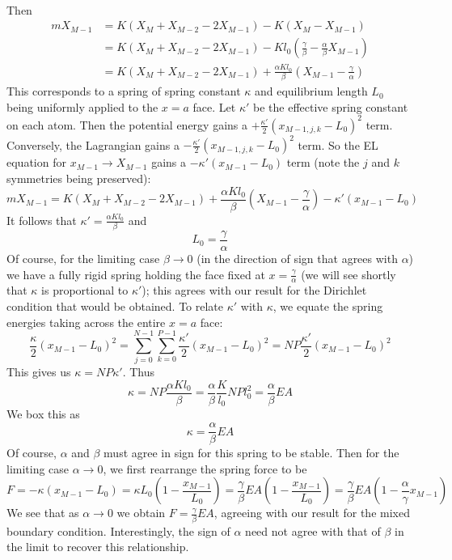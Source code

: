 \documentclass[letterpaper,12pt]{article}
\begin{document}
\begin{flushleft}
\begin{align*}
    \end{align*}
    Then
    \begin{align*}
        mX_{M-1} &= K(X_{M} + X_{M-2} - 2X_{M-1}) - K(X_M - X_{M-1}) \\
        &= K(X_{M} + X_{M-2} - 2X_{M-1}) - Kl_0\left(\frac{\gamma}{\beta} - \frac{\alpha}{\beta}X_{M-1}\right) \\
        &= K(X_{M} + X_{M-2} - 2X_{M-1}) + \frac{\alpha Kl_0}{\beta}\left(X_{M-1} - \frac{\gamma}{\alpha}\right)
    \end{align*}
    This corresponds to a spring of spring constant $\kappa$ and equilibrium length $L_0$ being uniformly applied to the $x=a$ face. Let $\kappa'$ be the effective spring constant on each atom. Then the potential energy gains a $+\frac{\kappa'}{2}\left(x_{M-1,j,k} - L_0\right)^2$ term. Conversely, the Lagrangian gains a $-\frac{\kappa'}{2}\left(x_{M-1,j,k} - L_0\right)^2$ term. So the EL equation for $x_{M-1} \to X_{M-1}$ gains a $-\kappa'\left(x_{M-1} - L_0\right)$ term (note the $j$ and $k$ symmetries being preserved):
    $$mX_{M-1} = K(X_{M} + X_{M-2} - 2X_{M-1}) + \frac{\alpha Kl_0}{\beta}\left(X_{M-1} - \frac{\gamma}{\alpha}\right) - \kappa'\left(x_{M-1} - L_0\right)$$
    It follows that $\kappa' = \frac{\alpha Kl_0}{\beta}$ and
    $$\boxed{L_0 = \frac{\gamma}{\alpha}}$$
    Of course, for the limiting case $\beta \to 0$ (in the direction of sign that agrees with $\alpha$) we have a fully rigid spring holding the face fixed at $x = \frac{\gamma}{\alpha}$ (we will see shortly that $\kappa$ is proportional to $\kappa'$); this agrees with our result for the Dirichlet condition that would be obtained. To relate $\kappa'$ with $\kappa$, we equate the spring energies taking across the entire $x=a$ face:
    $$\frac{\kappa}{2} \left(x_{M-1} - L_0\right)^2 = \sum_{j=0}^{N-1}\sum_{k=0}^{P-1}\frac{\kappa'}{2} \left(x_{M-1} - L_0\right)^2 = NP\frac{\kappa'}{2} \left(x_{M-1} - L_0\right)^2$$
    This gives us $\kappa = NP\kappa'$. Thus
    $$\kappa = NP\frac{\alpha Kl_0}{\beta} = \frac{\alpha}{\beta} \frac{K}{l_0} NPl_0^2 = \frac{\alpha}{\beta}EA$$
    We box this as
    $$\boxed{\kappa = \frac{\alpha}{\beta}EA}$$
    Of course, $\alpha$ and $\beta$ must agree in sign for this spring to be stable. Then for the limiting case $\alpha \to 0$, we first rearrange the spring force to be
    $$F = -\kappa\left(x_{M-1} - L_0\right) = \kappa L_0\left(1 - \frac{x_{M-1}}{L_0}\right) = \frac{\gamma}{\beta}EA\left(1 - \frac{x_{M-1}}{L_0}\right) = \frac{\gamma}{\beta}EA\left(1 - \frac{\alpha}{\gamma}x_{M-1}\right)$$
    We see that as $\alpha \to 0$ we obtain $F = \frac{\gamma}{\beta}EA$, agreeing with our result for the mixed boundary condition. Interestingly, the sign of $\alpha$ need not agree with that of $\beta$ in the limit to recover this relationship.

\end{flushleft}
\end{document}
